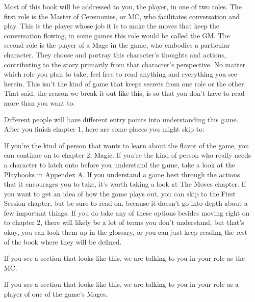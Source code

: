 \documentclass[
  oneside,
  statementpaper,
  9pt]{memoir}
\begin{document}
\begin{Narrator}

Most of this book will be addressed to you, the player, in one of two roles. The first role is the Master of Ceremonies, or MC, who facilitates conversation and play. This is the player whose job it is to make the moves that keep the conversation flowing, in some games this role would be called the GM. The second role is the player of a Mage in the game, who embodies a particular character. They choose and portray this character's thoughts and actions, contributing to the story primarily from that character's perspective. No matter which role you plan to take, feel free to read anything and everything you see herein. This isn't the kind of game that keeps secrets from one role or the other. That said, the reason we break it out like this, is so that you don't have to read more than you want to.

Different people will have different entry points into understanding this game. After you finish chapter 1, here are some places you might skip to:

If you're the kind of person that wants to learn about the flavor of the game, you can continue on to chapter 2, Magic. If you're the kind of person who really needs a character to latch onto before you understand the game, take a look at the Playbooks in Appendex A. If you understand a game best through the actions that it encourages you to take, it's worth taking a look at The Moves chapter. If you want to get an idea of how the game plays out, you can skip to the First Session chapter, but be sure to read on, because it doesn't go into depth about a few important things. If you do take any of these options besides moving right on to chapter 2, there will likely be a lot of terms you don't understand, but that's okay, you can look them up in the glossary, or you can just keep reading the rest of the book where they will be defined.

\end{Narrator}

\begin{MC}

If you see a section that looks like this, we are talking to you in your role as the MC.

\end{MC}

\begin{Player}

If you see a section that looks like this, we are talking to you in your role as a player of one of the game's Mages.

\end{Player}
\end{document}
